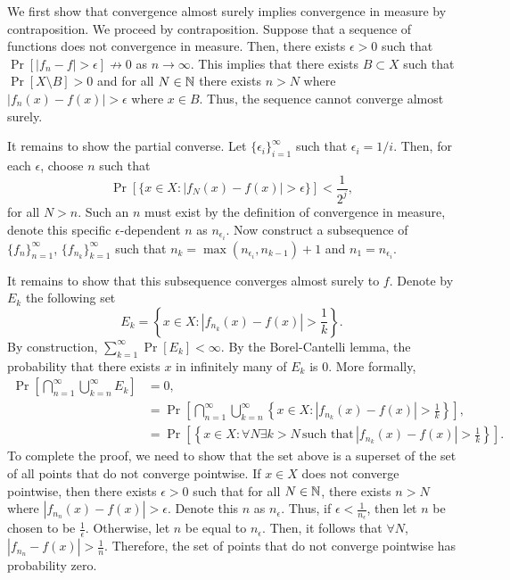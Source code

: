 \begin{solution}
    We first show that convergence almost surely implies convergence in measure by contraposition. We proceed by contraposition. Suppose that a sequence of functions does not convergence in measure. Then, there exists $\epsilon > 0$ such that $\Pr[|f_n - f| > \epsilon] \not \to 0$ as $n\to \infty$. This implies that there exists $B \subset X$ such that $\Pr[X \setminus B] > 0$ and for all $N \in \mathbb{N}$ there exists $n > N$ where $|f_n(x) - f(x)| > \epsilon$ where $x \in B$. Thus, the sequence cannot converge almost surely. 

    It remains to show the partial converse. Let $\{\epsilon_i\}_{i=1}^\infty$ such that $\epsilon_i = 1/i$. Then, for each $\epsilon$, choose $n$ such that \[
        \Pr[\{x \in X: |f_N(x) - f(x)| > \epsilon\}] < \frac{1}{2^j},
    \]
    for all $N > n$. Such an $n$ must exist by the definition of convergence in measure, denote this specific $\epsilon$-dependent $n$ as $n_{\epsilon_i}$. Now construct a subsequence of $\{f_n\}_{n=1}^\infty$, $\{f_{n_k}\}_{k=1}^\infty$ such that $n_k = \max (n_{\epsilon_i}, n_{k-1})+1$ and $n_1 = n_{\epsilon_i}$.

    It remains to show that this subsequence converges almost surely to $f$. Denote by $E_k$ the following set 
    \[
        E_k = \left\{x \in X: |f_{n_k}(x) - f(x)| > \frac{1}{k}\right\}.
    \]
    By construction, $\sum_{k=1}^\infty \Pr[E_k] < \infty$. By the Borel-Cantelli lemma, the probability that there exists $x$ in infinitely many of $E_k$ is 0. More formally, 
    \begin{align*}
        \Pr\left[\bigcap_{n=1}^\infty \bigcup_{k=n}^\infty E_k\right] &= 0, \\
        &= \Pr\left[\bigcap_{n=1}^\infty\bigcup_{k=n}^\infty \left\{x \in X: |f_{n_k}(x) - f(x)| > \frac{1}{k}\right\}\right], \\
        &= \Pr\left[\left\{x \in X: \forall N \exists k > N\,\text{such that}\, |f_{n_k}(x) - f(x) | > \frac{1}{k}\right\}\right].
    \end{align*}
    To complete the proof, we need to show that the set above is a superset of the set of all points that do not converge pointwise. If $x \in X$ does not converge pointwise, then there exists $\epsilon > 0$ such that for all $N \in \mathbb{N}$, there exists $n > N$ where $|f_{n_n}(x) - f(x)| > \epsilon$. Denote this $n$ as $n_\epsilon$. Thus, if $\epsilon < \frac{1}{n_\epsilon}$, then let $n$ be chosen to be $\frac{1}{\epsilon}$. Otherwise, let $n$ be equal to $n_\epsilon$. Then, it follows that $\forall N$, $|f_{n_n} - f(x)| > \frac{1}{n}$. Therefore, the set of points that do not converge pointwise has probability zero. 
\end{solution}

